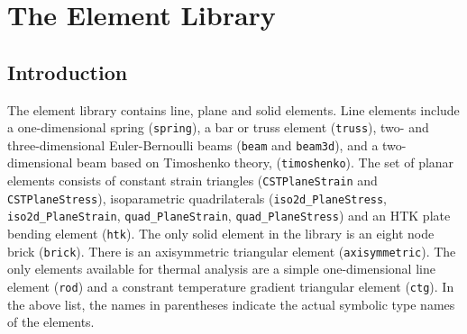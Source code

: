 
\newpage{\pagestyle{empty}\cleardoublepage}

\chapter{The \felt{} Element Library}
\label{elements}

\section{Introduction}
\label{elements.intro}

The \felt{} element library contains line, plane and solid elements.
Line elements include a one-dimensional spring ({\tt spring}), a bar or truss 
element ({\tt truss}), two- and 
three-dimensional Euler-Bernoulli beams ({\tt beam} and {\tt beam3d}), and
a two-dimensional beam based on Timoshenko theory, ({\tt timoshenko}). The
set of planar elements consists of constant strain triangles  
({\tt CSTPlaneStrain} and {\tt CSTPlaneStress}), isoparametric quadrilaterals 
({\tt iso2d\_PlaneStress}, {\tt iso2d\_PlaneStrain}, {\tt quad\_PlaneStrain}, 
{\tt quad\_PlaneStress}) and an HTK plate bending element ({\tt htk}).
The only solid element in the library is an eight node brick ({\tt brick}).
There is an axisymmetric triangular element ({\tt axisymmetric}).
The only elements available for thermal analysis are a simple one-dimensional
line element ({\tt rod}) and a constrant temperature gradient triangular
element ({\tt ctg}).  In the above list, the names in parentheses indicate 
the actual symbolic type names of the elements.

